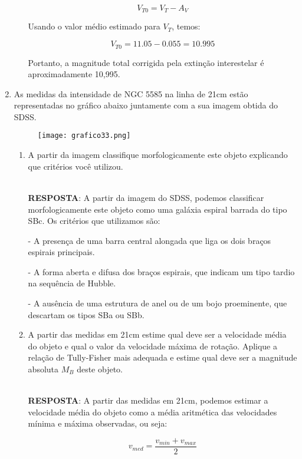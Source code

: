 \documentclass[a4paper,12pt]{article}
\begin{document}
\begin{enumerate}
\begin{enumerate}
$$V_{T0} = V_T - A_V$$

Usando o valor médio estimado para $V_T$, temos:

$$V_{T0} = 11.05 - 0.055 = 10.995$$

Portanto, a magnitude total corrigida pela extinção interestelar é aproximadamente 10,995.

\noindent\hrulefill

\end{enumerate}

\item As medidas da intensidade de NGC 5585 na linha de 21cm estão 
representadas no gráfico abaixo juntamente com a sua imagem obtida do 
SDSS.

\begin{figure}[H]
\centering
\texttt{[image: grafico33.png]}
\end{figure}

\begin{enumerate}
\item A partir da imagem classifique morfologicamente este objeto explicando que critérios você utilizou.

\noindent\hrulefill\\\textbf{RESPOSTA}: A partir da imagem do SDSS, podemos classificar morfologicamente este objeto como uma galáxia espiral barrada do tipo SBc. Os critérios que utilizamos são:

- A presença de uma barra central alongada que liga os dois braços espirais principais.

- A forma aberta e difusa dos braços espirais, que indicam um tipo tardio na sequência de Hubble.

- A ausência de uma estrutura de anel ou de um bojo proeminente, que descartam os tipos SBa ou SBb.

\noindent\hrulefill

\item A partir das medidas em 21cm estime qual deve ser a velocidade média 
do objeto e qual o valor da velocidade máxima de rotação. Aplique a 
relação de Tully-Fisher mais adequada e estime qual deve ser a magnitude 
absoluta $M_B$ deste objeto.

\noindent\hrulefill\\\textbf{RESPOSTA}: A partir das medidas em 21cm, podemos estimar a velocidade média do objeto como a média aritmética das velocidades mínima e máxima observadas, ou seja:

$$v_{med} = \frac{v_{min} + v_{max}}{2}$$


\end{enumerate}
\end{enumerate}
\end{document}
